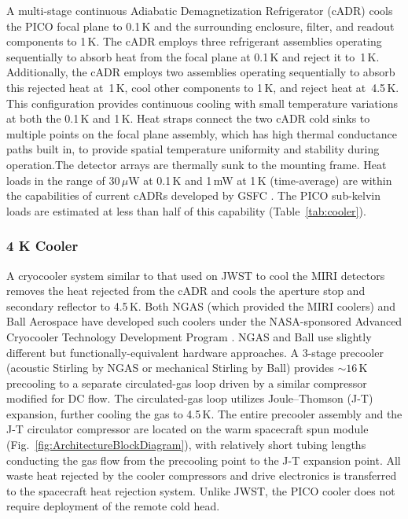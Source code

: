 A multi-stage continuous Adiabatic Demagnetization Refrigerator (cADR)
cools the PICO focal plane to 0.1\,K and the surrounding enclosure,
filter, and readout components to 1\,K. The cADR employs three
refrigerant assemblies operating sequentially to absorb heat from the
focal plane at 0.1\,K and reject it to~1\,K. Additionally, the cADR
employs two assemblies operating sequentially to absorb this rejected
heat at~1\,K, cool other components to 1\,K, and reject heat at~4.5\,K. 
This configuration provides continuous cooling with small
temperature variations at both the 0.1\,K and 1\,K. Heat straps
connect the two cADR cold sinks to multiple points on the focal plane
assembly, which has high thermal conductance paths built in, to
provide spatial temperature uniformity and stability during
operation.The detector arrays are thermally sunk to the mounting
frame.  Heat loads in the range of 30\,$\mu$W at 0.1\,K and 1\,mW at
1\,K (time-average) are within the capabilities of current cADRs
developed by GSFC \citep{Shirron2012,Shirron2016}. The PICO sub-kelvin
loads are estimated at less than half of this capability (Table~\ref{tab:cooler}).

\subsubsection{4 K Cooler}
\label{sec:4kcooler} %

A cryocooler system similar to that used on JWST to cool the MIRI
detectors \citep{Durand2008,Rabb2013} removes the heat rejected from
the cADR and cools the aperture stop and secondary reflector to
4.5\,K. Both NGAS (which provided the MIRI coolers) and Ball Aerospace
have developed such coolers under the NASA-sponsored Advanced
Cryocooler Technology Development Program \citep{Glaister2006}. NGAS
and Ball use slightly different but functionally-equivalent hardware
approaches. A 3-stage precooler (acoustic Stirling by NGAS or
mechanical Stirling by Ball) provides $\sim16$\,K precooling to a
separate circulated-gas loop driven by a similar compressor modified
for DC flow. The circulated-gas loop utilizes Joule--Thomson (J-T)
expansion, further cooling the gas to 4.5\,K. The entire precooler
assembly and the J-T circulator compressor are located on the warm
spacecraft spun module (Fig.~\ref{fig:ArchitectureBlockDiagram}), 
with relatively short tubing lengths conducting the gas
flow from the precooling point to the J-T expansion point. All waste
heat rejected by the cooler compressors and drive electronics is
transferred to the spacecraft heat rejection system. Unlike JWST, the
PICO cooler does not require deployment of the remote cold head.

